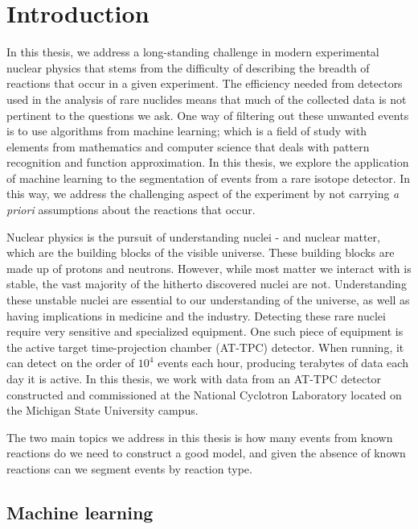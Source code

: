 \chapter{Introduction}\label{ch:introduction}

In this thesis, we address a long-standing challenge in modern experimental nuclear physics that stems from the difficulty of describing the breadth of reactions that occur in a given experiment. The efficiency needed from detectors used in the analysis of rare nuclides means that much of the collected data is not pertinent to the questions we ask. One way of filtering out these unwanted events is to use algorithms from machine learning; which is a field of study with elements from mathematics and computer science that deals with pattern recognition and function approximation. In this thesis, we explore the application of machine learning to the segmentation of events from a rare isotope detector. In this way, we address the challenging aspect of the experiment by not carrying \textit{a priori} assumptions about the reactions that occur. 

Nuclear physics is the pursuit of understanding nuclei - and nuclear matter, which are the building blocks of the visible universe. These building blocks are made up of protons and neutrons. However, while most matter we interact with is stable, the vast majority of the hitherto discovered nuclei are not. Understanding these unstable nuclei are essential to our understanding of the universe, as well as having implications in medicine and the industry. Detecting these rare nuclei require very sensitive and specialized equipment. One such piece of equipment is the active target time-projection chamber (AT-TPC) detector. When running, it can detect on the order of $10^4$ events each hour, producing terabytes of data each day it is active. In this thesis, we work with data from an AT-TPC detector constructed and commissioned at the National Cyclotron Laboratory located on the Michigan State University campus. 

The two main topics we address in this thesis is how many events from known reactions do we need to construct a good model, and given the absence of known reactions can we segment events by reaction type. 

\section{Machine learning}

